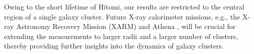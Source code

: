 Owing to the short lifetime of Hitomi, our results are restricted to the central region of a single galaxy cluster. Future X-ray calorimeter missions, e.g., the X-ray Astronomy Recovery Mission (XARM) and Athena \citep{nandra13}, will be crucial for extending the measurements to larger radii and a larger number of clusters, thereby providing further insights into the dynamics of galaxy clusters.
